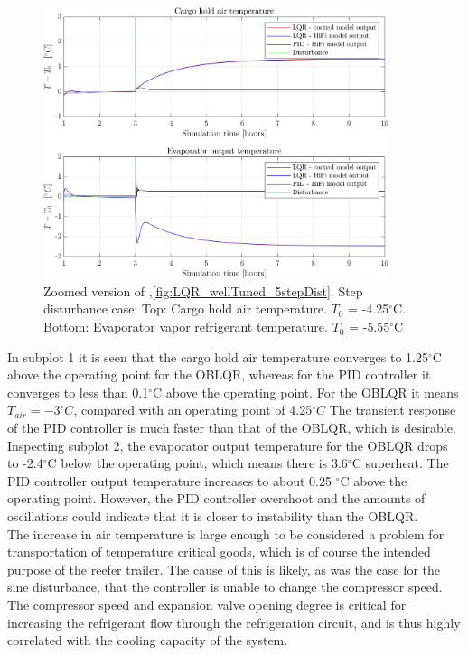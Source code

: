 \begin{figure}[H]
	\centering
	\includegraphics[width=0.9\textwidth]{Graphics/fig_LQRvsKresten_stepDist_zoom.png}
	\caption{Zoomed version of ,\cref{fig:LQR_wellTuned_5stepDist}. Step disturbance case: Top: Cargo hold air temperature. $T_0$ = -4.25$^{\circ}$C. Bottom: Evaporator vapor refrigerant temperature. $T_0$ = -5.55$^{\circ}$C}
	\label{fig:LQR_wellTuned_5stepDist_zoom}
\end{figure}

\noindent In subplot 1 it is seen that the cargo hold air temperature converges to 1.25$^{\circ}$C above the operating point for the OBLQR, whereas for the PID controller it converges to less than 0.1$^{\circ}$C above the operating point.
For the OBLQR it means $T_{air} = -3^{\circ}C$, compared with an operating point of 4.25$^{\circ}C$
The transient response of the PID controller is much faster than that of the OBLQR, which is desirable. 
Inspecting subplot 2, the evaporator output temperature for the OBLQR drops to -2.4$^{\circ}$C below the operating point, which means there is 3.6$^{\circ}$C superheat. The PID controller output temperature increases to about 0.25 $^{\circ}$C above the operating point.
However, the PID controller overshoot and the amounts of oscillations could indicate that it is closer to instability than the OBLQR.\\

The increase in air temperature is large enough to be considered a problem for transportation of temperature critical goods, which is of course the intended purpose of the reefer trailer. The cause of this is likely, as was the case for the sine disturbance, that the controller is unable to change the compressor speed. The compressor speed and expansion valve opening degree is critical for increasing the refrigerant flow through the refrigeration circuit, and is thus highly correlated with the cooling capacity of the system. \\

